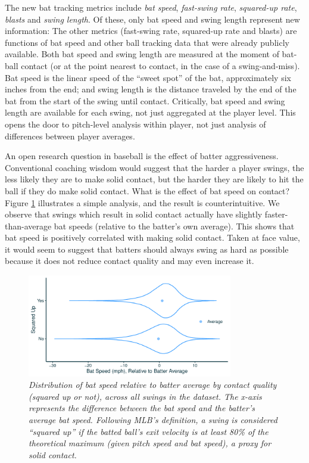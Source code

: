\documentclass{article}
\begin{document}
    The new bat tracking metrics include {\it bat speed}, {\it fast-swing rate}, {\it squared-up rate}, {\it blasts} and {\it swing length}. Of these, only bat speed and swing length represent new information: The other metrics (fast-swing rate, squared-up rate and blasts) are functions of bat speed and other ball tracking data that were already publicly available. Both bat speed and swing length are measured at the moment of bat-ball contact (or at the point nearest to contact, in the case of a swing-and-miss). Bat speed is the linear speed of the ``sweet spot'' of the bat, approximately six inches from the end; and swing length is the distance traveled by the end of the bat from the start of the swing until contact. Critically, bat speed and swing length are available for each swing, not just aggregated at the player level. This opens the door to pitch-level analysis within player, not just analysis of differences between player averages.

    An open research question in baseball is the effect of batter aggressiveness. Conventional coaching wisdom would suggest that the harder a player swings, the less likely they are to make solid contact, but the harder they are likely to hit the ball if they do make solid contact. What is the effect of bat speed on contact? Figure \ref{fig:counterintuitive} illustrates a simple analysis, and the result is counterintuitive. We observe that swings which result in solid contact actually have slightly faster-than-average bat speeds (relative to the batter's own average). This shows that bat speed is positively correlated with making solid contact. Taken at face value, it would seem to suggest that batters should always swing as hard as possible because it does not reduce contact quality and may even increase it.

    \begin{figure}[H]
      \centering
      \includegraphics[width = 0.8\textwidth]{figures/counterintuitive.pdf}
      \caption{\it Distribution of bat speed relative to batter average by contact quality (squared up or not), across all swings in the dataset. The x-axis represents the difference between the bat speed and the batter's average bat speed. Following MLB's definition, a swing is considered ``squared up'' if the batted ball's exit velocity is at least 80\% of the theoretical maximum (given pitch speed and bat speed), a proxy for solid contact.}
      \label{fig:counterintuitive}
    \end{figure}
\end{document}

